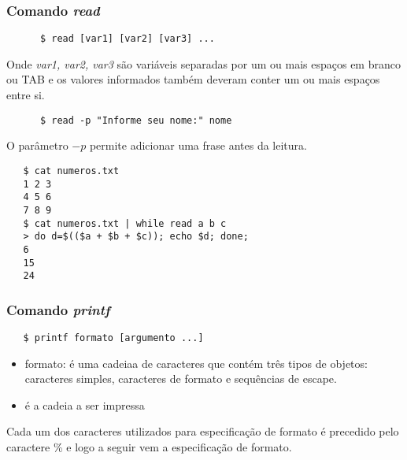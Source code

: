\documentclass{beamer}
\begin{document}
   \begin{frame}[fragile]
      \frametitle{Comando \textit{read}}
      \begin{verbatim}
      $ read [var1] [var2] [var3] ... 
      \end{verbatim}
      Onde \textit{var1, var2, var3} são variáveis separadas por um ou mais espaços em branco ou TAB e os valores informados também deveram conter um ou mais espaços entre si. 
      \begin{verbatim}
      $ read -p "Informe seu nome:" nome 
      \end{verbatim}
      O parâmetro $-p$ permite adicionar uma frase antes da leitura.
\end{frame}

   \begin{frame}[fragile]
   \begin{verbatim}
   $ cat numeros.txt 
   1 2 3
   4 5 6
   7 8 9
   $ cat numeros.txt | while read a b c
   > do d=$(($a + $b + $c)); echo $d; done;
   6
   15
   24
   \end{verbatim}
\end{frame}

   \begin{frame}[fragile]
      \frametitle{Comando \textit{printf}}
      \begin{verbatim} 
   $ printf formato [argumento ...]         
      \end{verbatim}
      \begin{itemize}
         \item formato: é uma cadeiaa de caracteres que contém três tipos de objetos: caracteres simples, caracteres de formato e sequências de escape.
	      \item é a cadeia a ser impressa
      \end{itemize}
      Cada um dos caracteres utilizados para especificação de formato é precedido pelo caractere \% e logo a seguir vem a especificação de formato.
\end{frame}

\end{document}
